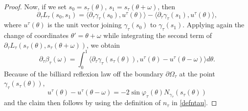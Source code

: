 \documentclass[10pt,a4paper]{amsart}
\begin{document}
\begin{proof}
Now, if we set $s_0 = s_{\tau}(\theta)$, $s_1 = s_{\tau}(\theta+\omega)$, then
\[
\partial_{\tau} L_{\tau}(s_0,s_1) = 
\langle \partial_{\tau}\gamma_{\tau}(s_0), u^{\tau}(\theta) \rangle
-\langle \partial_{\tau}\gamma_{\tau}(s_1), u^{\tau}(\theta) \rangle,
\]
where $u^{\tau}(\theta)$ is the unit vector joining $\gamma_{\tau}(s_0)$ to $\gamma_{\tau}(s_1)$. Applying again the change of coordinates $\theta'=\theta+\omega$ while integrating the second term of $\partial_{\tau} L_{\tau}(s_{\tau}(\theta),s_{\tau}(\theta+\omega))$, we obtain
\[
\partial_{\tau}\beta_{\tau}(\omega) = \int_{0}^{1} 
\langle \partial_{\tau}\gamma_{\tau}(s_{\tau}(\theta)), u^{\tau}(\theta)-u^{\tau}(\theta-\omega) \rangle d\theta.
\]
Because of the billiard reflexion law off the boundary $\partial\Omega_{\tau}$ at the point $\gamma_{\tau}(s_{\tau}(\theta))$, 
\[
u^{\tau}(\theta)-u^{\tau}(\theta-\omega) = -2\sin\varphi_{\tau}(\theta)N_{\gamma_{\tau}}(s_{\tau}(\theta))
\]
and the claim then follows by using the definition of $n_\tau$ in \eqref{defntau}.
\end{proof}
\end{document}

